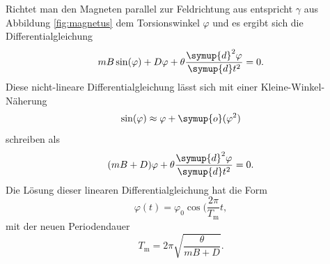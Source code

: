 Richtet man den Magneten parallel zur Feldrichtung aus entspricht $\gamma$ aus Abbildung
\ref{fig:magnetus} dem Torsionswinkel $\varphi$ und es ergibt sich die Differentialgleichung
\begin{equation}
	m B \sin(\varphi)  + D \varphi + \theta \frac{\symup{d}^2 \varphi}{\symup{d} t^2} = 0
	\mathrm{.}
\end{equation}
Diese nicht-lineare Differentialgleichung lässt sich mit einer Kleine-Winkel-Näherung
\begin{equation*}
	\sin(\varphi) \approx \varphi + \symup{o}(\varphi^2)
\end{equation*}
schreiben als
\begin{equation}
	(mB + D) \varphi + \theta \frac{\symup{d}^2 \varphi}{\symup{d} t^2} = 0 \mathrm{.}
\end{equation}
Die Lösung dieser linearen Differentialgleichung hat die Form
\begin{equation}
	\varphi(t) = \varphi_0 \cos(\frac{2\pi}{T_{\mathrm{m}}} t \mathrm{,}
\end{equation}
mit der neuen Periodendauer
\begin{equation}
	T_{\mathrm{m}} = 2\pi \sqrt{\frac{\theta}{mB + D}} \mathrm{.}
\end{equation}

